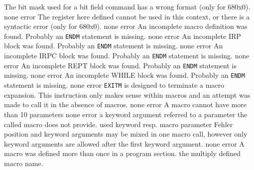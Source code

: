 \documentclass[12pt,twoside]{report}
\newcommand{\tty}[1]{{\tt #1}}
\begin{document}
\begin{description}
               {The bit mask used for a bit field command has a wrong
                format (only for 680x0).}
               {none}
               {error}
               {The register here defined cannot be used in this context,
                or there is a syntactic error (only for 680x0).}
               {none}
               {error}
               {An incomplete macro definition was found. Probably an
                \tty{ENDM} statement is missing.}
               {none}
               {error}
               {An incomplete IRP block was found. Probably an
                \tty{ENDM} statement is missing.}
               {none}
               {error}
               {An incomplete IRPC block was found. Probably an
                \tty{ENDM} statement is missing.}
               {none}
               {error}
               {An incomplete REPT block was found. Probably an
                \tty{ENDM} statement is missing.}
               {none}
               {error}
               {An incomplete WHILE block was found. Probably an
                \tty{ENDM} statement is missing.}
               {none}
               {error}
               {\tty{EXITM} is designed to terminate a macro expansion.  This
                instruction only makes sense within macros and an attempt
                was made to call it in the absence of macros.}
               {none}
               {error}
               {A macro cannot have more than 10 parameters}
               {none}
               {error}
               {a keyword argument referred to a parameter the
                called macro does not provide.}
               {used keyword resp. macro parameter}
               {Fehler}
               {position and keyword arguments  may be mixed in
                one macro call, however only keyword arguments
                are allowed after the first keyword argument.}
               {none}
               {error}
               {A macro was defined more than once in a program section.}
               {the multiply defined macro name.}

\end{description}
\end{document}
